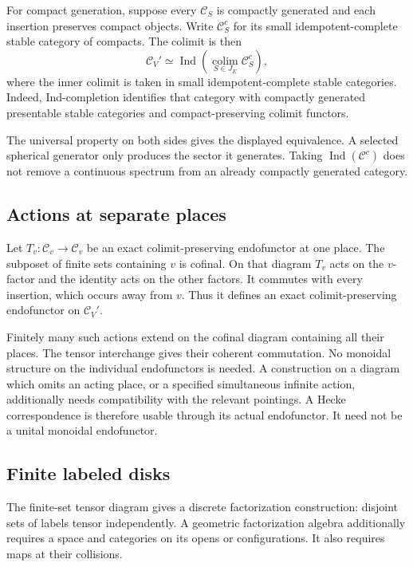 For compact generation, suppose every \(\mathcal C_S\) is compactly
generated and each insertion preserves compact objects.
Write \(\mathcal C_S^c\) for its small idempotent-complete stable
category of compacts. The colimit is then
\[
 \mathcal C_V'\simeq
 \operatorname{Ind}\!
 \left(\operatorname*{colim}_{S\in J_E}
                    \mathcal C_S^c\right),
\]
where the inner colimit is taken in small idempotent-complete stable
categories. Indeed, Ind-completion identifies that category with
compactly generated presentable stable categories and
compact-preserving colimit functors.

The universal property on both
sides gives the displayed equivalence.
A selected spherical generator only produces the sector it generates.
Taking \(\operatorname{Ind}(\mathcal C^c)\) does not remove a
continuous spectrum from an already compactly generated category.

\subsection{Actions at separate places}

Let \(T_v:\mathcal C_v\to\mathcal C_v\) be an exact
colimit-preserving endofunctor at one place.
The subposet of finite sets containing \(v\) is cofinal.
On that diagram \(T_v\) acts on the \(v\)-factor and the identity
acts on the other factors. It commutes with every insertion,
which occurs away from \(v\).
Thus it defines an exact colimit-preserving endofunctor on
\(\mathcal C_V'\).

Finitely many such actions extend on the cofinal diagram containing
all their places. The tensor interchange gives their coherent
commutation. No monoidal structure on the individual endofunctors
is needed. A construction on a diagram which omits an acting place,
or a specified simultaneous infinite action, additionally needs
compatibility with the relevant pointings.
A Hecke correspondence is therefore usable through its actual
endofunctor. It need not be a unital monoidal endofunctor.

\subsection{Finite labeled disks}

The finite-set tensor diagram gives a discrete factorization
construction: disjoint sets of labels tensor independently.
A geometric factorization algebra additionally requires a space
and categories on its opens or configurations.
It also requires maps at their collisions.

